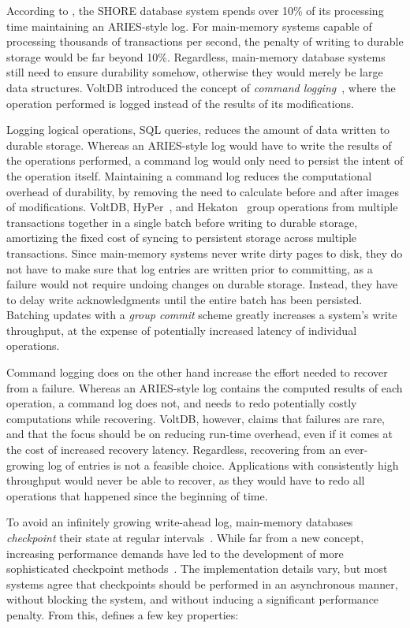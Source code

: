 According to \cite{oltp}, the SHORE
database system spends over 10\% of its processing time maintaining an
ARIES-style log. For main-memory systems capable of processing thousands of
transactions per second, the penalty of writing to durable storage would be far
beyond 10\%. Regardless, main-memory database systems still need to ensure
durability somehow, otherwise they would merely be large data structures. VoltDB
introduced the concept of \textit{command logging}~\cite{voltdb-recovery}, where
the operation performed is logged instead of the results of its modifications.

Logging logical operations, \eg SQL queries, reduces the amount of data written
to durable storage. Whereas an ARIES-style log would have to write the results
of the operations performed, a command log would only need to persist the intent
of the operation itself. Maintaining a command log reduces the computational
overhead of durability, by removing the need to calculate before and after
images of modifications. VoltDB, HyPer~\cite{hyper}, and Hekaton~\cite{hekaton}
group operations from multiple transactions together in a single batch before
writing to durable storage, amortizing the fixed cost of syncing to persistent
storage across multiple transactions. Since main-memory systems never write
dirty pages to disk, they do not have to make sure that log entries are written
prior to committing, as a failure would not require undoing changes on durable
storage. Instead, they have to delay write acknowledgments until the entire
batch has been persisted. Batching updates with a \textit{group commit} scheme
greatly increases a system's write throughput, at the expense of potentially
increased latency of individual operations.

Command logging does on the other hand increase the effort needed to recover
from a failure. Whereas an ARIES-style log contains the computed results of each
operation, a command log does not, and needs to redo potentially costly
computations while recovering. VoltDB, however, claims that failures are rare,
and that the focus should be on reducing run-time overhead, even if it comes at
the cost of increased recovery latency. Regardless, recovering from an
ever-growing log of entries is not a feasible choice. Applications with
consistently high throughput would never be able to recover, as they would have
to redo all operations that happened since the beginning of time.

To avoid an infinitely growing write-ahead log, main-memory databases
\textit{checkpoint} their state at regular intervals~\cite{main-memory, dali,
margaret, voltdb-recovery, hekaton}. While far from a new concept, increasing
performance demands have led to the development of more sophisticated checkpoint
methods~\cite{memory-checkpoint, siren}. The implementation details vary, but
most systems agree that checkpoints should be performed in an asynchronous
manner, without blocking the system, and without inducing a significant
performance penalty. From this, \cite{memory-checkpoint} defines a few key
properties:

